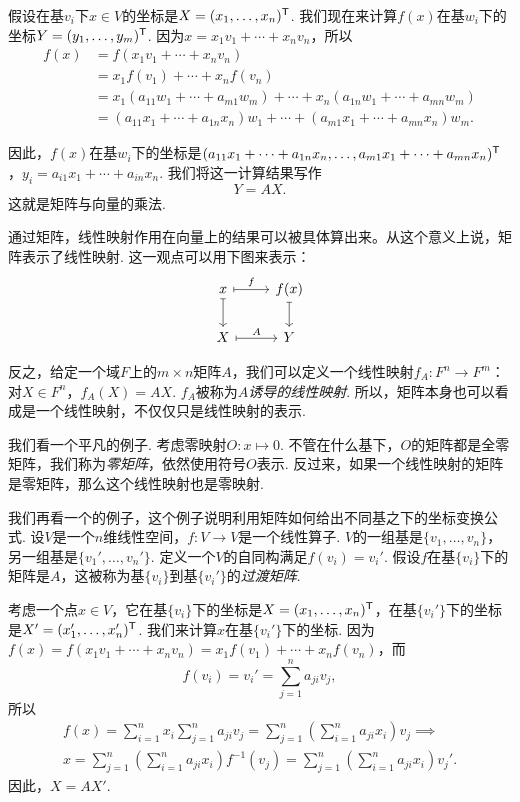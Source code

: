 假设在基$v_i$下$x\in V$的坐标是$X=(x_1,\dots,x_n)^{\mathsf{T}}$. 我们现在来计算$f(x)$在基$w_i$下的坐标$Y=(y_1,\dots,y_m)^{\mathsf{T}}$. 因为$x=x_1v_1+\cdots+x_nv_n$，所以
\begin{align*}
    f(x)&=f(x_1v_1+\cdots+x_nv_n)\\
    &=x_1f(v_1)+\cdots+x_nf(v_n)\\
    &=x_1(a_{11}w_1+\cdots+a_{m1}w_m)+\cdots+x_n(a_{1n}w_1+\cdots+a_{mn}w_m)\\
    &=(a_{11}x_1+\cdots+a_{1n}x_n)w_1+\cdots+(a_{m1}x_1+\cdots+a_{mn}x_n)w_m.
\end{align*}

因此，$f(x)$在基$w_i$下的坐标是$(a_{11}x_1+\cdots+a_{1n}x_n,\dots,a_{m1}x_1+\cdots+a_{mn}x_n)^{\mathsf{T}}$，$y_i=a_{i1}x_1+\cdots+a_{in}x_n$. 我们将这一计算结果写作
\[Y=AX.\]
这就是矩阵与向量的乘法.

通过矩阵，线性映射作用在向量上的结果可以被具体算出来。从这个意义上说，矩阵表示了线性映射. 这一观点可以用下图来表示：
\[\begin{tikzcd}
    x\arrow[r,mapsto,"f"]\arrow[d,mapsto]&f(x)\arrow[d,mapsto]\\
    X\arrow[r,mapsto,"A"]&Y
    \end{tikzcd}\] 

反之，给定一个域$F$上的$m\times n$矩阵$A$，我们可以定义一个线性映射$f_A:F^n\to F^m$：对$X\in F^n$，$f_A(X)=AX$. $f_A$被称为$A$\emph{诱导的线性映射}. 所以，矩阵本身也可以看成是一个线性映射，不仅仅只是线性映射的表示. 

我们看一个平凡的例子. 考虑零映射$O:x\mapsto 0$. 不管在什么基下，$O$的矩阵都是全零矩阵，我们称为\emph{零矩阵}，依然使用符号$O$表示. 反过来，如果一个线性映射的矩阵是零矩阵，那么这个线性映射也是零映射. 

我们再看一个的例子，这个例子说明利用矩阵如何给出不同基之下的坐标变换公式. 设$V$是一个$n$维线性空间，$f:V\to V$是一个线性算子. $V$的一组基是$\{v_1,\dots,v_n\}$，另一组基是$\{v_1',\dots,v_n'\}$. 定义一个$V$的自同构满足$f(v_i)=v_i'$. 假设$f$在基$\{v_i\}$下的矩阵是$A$，这被称为基$\{v_i\}$到基$\{v_i'\}$的\emph{过渡矩阵}.

考虑一个点$x\in V$，它在基$\{v_i\}$下的坐标是$X=(x_1,\dots,x_n)^{\mathsf{T}}$，在基$\{v_i'\}$下的坐标是$X'=(x_1',\dots,x_n')^{\mathsf{T}}$. 我们来计算$x$在基$\{v_i'\}$下的坐标. 因为$f(x)=f(x_1v_1+\cdots+x_nv_n)=x_1f(v_1)+\cdots+x_nf(v_n)$，而
\[f(v_i)=v_i'=\sum_{j=1}^n a_{ji}v_j,\]
所以
\begin{gather*}
f(x)=\sum_{i=1}^n x_i\sum_{j=1}^n a_{ji}v_j=\sum_{j=1}^n\left(\sum_{i=1}^n a_{ji}x_i\right)v_j\implies\\
 x=\sum_{j=1}^n\left(\sum_{i=1}^n a_{ji}x_i\right)f^{-1}(v_j)=\sum_{j=1}^n\left(\sum_{i=1}^n a_{ji}x_i\right)v_j'.
\end{gather*}
因此，$X=AX'$.


